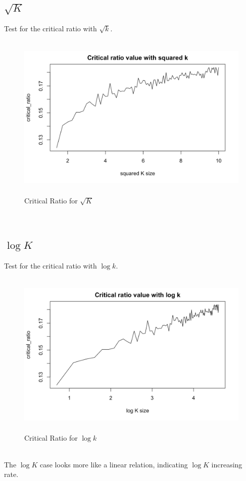 \documentclass[english]{article}\usepackage{graphicx, color}
\numberwithin{equation}{section}
\numberwithin{figure}{section}
\begin{document}
\quad\\
\quad\\
\quad\\
\quad\\
\quad\\
\quad\\
\quad\\
\quad\\
\quad\\
\quad\\
\subsection{$\sqrt{K}$}
Test for the critical ratio with $\sqrt{k}$.
\begin{figure}[htbp]
\centering\includegraphics[width=4.5in,height=3.15in]{sqrt}
\caption{Critical Ratio for $\sqrt{K}$}
\end{figure}
\quad\\
\subsection{$\log{K}$}
Test for the critical ratio with $\log{k}$.
\begin{figure}[htbp]
\centering\includegraphics[width=4.8in,height=3.15in]{log}
\caption{Critical Ratio for $\log{k}$}
\end{figure}
\quad\\
The $\log{K}$ case looks more like a linear relation, indicating $\log{K}$ increasing rate.
\end{document}
